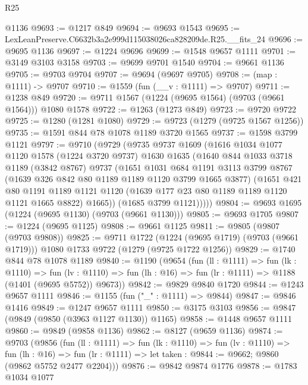 \begin{lexlean}{R25}
\begin{coremodule}
    @1136
@9693 := @1217 @849
@9694 := @9693 @1543
@9695 := LexLeanPreserve.C6632b3a2e999d115038026ca828209de.R25.__fits_24
@9696 := @9695 @1136
@9697 := @1224 @9696
@9699 := @1548 @9657 @1111
@9701 := @3149 @3103 @3158
@9703 := @9699 @9701 @1540
@9704 := @9661 @1136
@9705 := @9703 @9704
@9707 := @9694 (@9697 @9705)
@9708 := (map : @1111) -> @9707
@9710 := @1559 (fun (__v : @1111) => @9707)
@9711 := @1238 @849
@9720 := @9711 @1567 (@1224 (@9695 @1564) (@9703 (@9661 @1564))) @1080 @1578
@9722 := @1263 (@1273 @849)
@9723 := @9720 @9722
@9725 := @1280 (@1281 @1080)
@9729 := @9723 (@1279 (@9725 @1567 @1256))
@9735 := @1591 @844 @78 @1078 @1189 @3720 @1565
@9737 := @1598 @3799 @1121
@9797 := @9710
    (@9729
      (@9735
        @9737
        @1609
        (@1616
          @1034
          @1077
          @1120
          @1578
          (@1224 @3720 @9737)
          @1630
          @1635
          (@1640
            @844
            @1033
            @3718
            @1189
            (@3842 @8767)
            @9737
            (@1651
              @1031
              @684
              @1191
              @3113
              @3799
              @8767
              (@1639 @326 @842 @80 @1189 @1189 @1120 @3799 @1665 @3877)
              (@1651
                @421
                @80
                @1191
                @1189
                @1121
                @1120
                (@1639 @177 @23 @80 @1189 @1189 @1120 @1121 @1665 @8822)
                @1665))
            (@1685 @3799 @1121)))))
@9804 := @9693 @1695 (@1224 (@9695 @1130) (@9703 (@9661 @1130)))
@9805 := @9693 @1705
@9807 := @1224 (@9695 @1125)
@9808 := @9661 @1125
@9811 := @9805 (@9807 (@9703 @9808))
@9825 := @9711
    @1722
    (@1224 (@9695 @1719) (@9703 (@9661 @1719)))
    @1080
    @1733
    @9722
    (@1279 (@9725 @1722 @1256))
@9829 := @1740 @844 @78 @1078 @1189
@9840 := @1190
    (@9654
      (fun (ll : @1111) =>
      fun (lk : @1110) =>
      fun (lv : @1110) => fun (lh : @16) => fun (lr : @1111) => @1188 (@1401 (@9695 @5752)) @9673))
@9842 := @9829 @9840 @1720
@9844 := @1243 @9657 @1111
@9846 := @1155 (fun ("_" : @1111) => @9844)
@9847 := @9846 @1416
@9849 := @1247 @9657 @1111
@9850 := @3175 @3103
@9856 := @9847 (@9849 (@9850 (@3963 @1127 @1130)) @1165)
@9858 := @1448 @9657 @1111
@9860 := @9849 (@9858 @1136)
@9862 := @8127 (@9659 @1136)
@9874 := @9703
    (@9856
      (fun (ll : @1111) =>
      fun (lk : @1110) =>
      fun (lv : @1110) =>
      fun (lh : @16) =>
      fun (lr : @1111) => let taken : @9844 := @9662; @9860 (@9862 @5752 @2477 @2204)))
@9876 := @9842 @9874 @1776
@9878 := @1783 @1034 @1077

\end{coremodule}
\end{lexlean}
